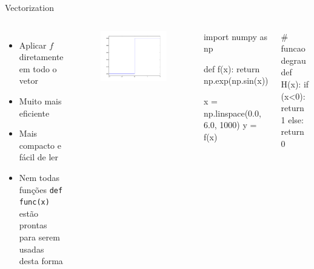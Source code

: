\documentclass[12pt,t,graphics]{beamer}
\begin{document}
\begin{frame}[t,fragile]{Vectorization}  
	\vspace{-0.5cm}
	\begin{columns}   
		\begin{itemize}
			\item Aplicar $f$ diretamente em todo o vetor
			\item Muito mais eficiente
			\item Mais compacto e fácil de ler
			\item Nem todas funções \texttt{def func(x)} estão prontas
			para serem usadas desta forma
		\end{itemize}
		\vspace{-0.5cm}
		\begin{figure}
			\centering
			\includegraphics[scale=0.2]{img/hv.png}
		\end{figure}
		\begin{python}
import numpy as np
		
def f(x):
    return np.exp(np.sin(x))
		
x = np.linspace(0.0, 6.0, 1000)
y = f(x)
\end{python}
		\pause
		\begin{python}
# funcao degrau 
def H(x):
    if (x<0):
    	return 1
    else:
    	return 0
		\end{python}
	\end{columns}
\end{frame}
\end{document}
